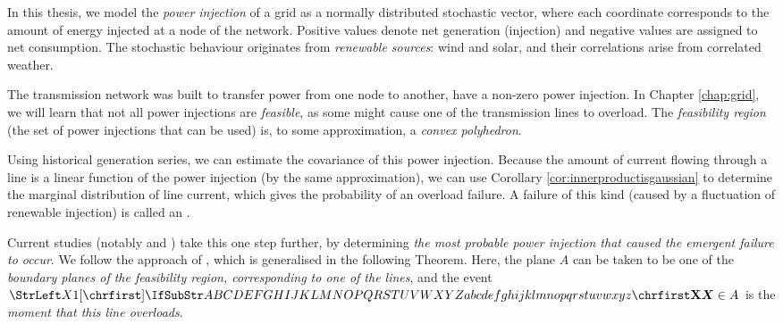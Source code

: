 \documentclass[main.tex]{subfiles}
\begin{document}
In this thesis, we model the \emph{power injection} of a grid as a normally distributed stochastic vector, where each coordinate corresponds to the amount of energy injected at a node of the network. Positive values denote net generation (injection) and negative values are assigned to net consumption. The stochastic behaviour originates from \emph{renewable sources}: wind and solar, and their correlations arise from correlated weather. 

The transmission network was built to transfer power from one node to another, \ie have a non-zero power injection.
In Chapter \ref{chap:grid}, we will learn that not all power injections are \emph{feasible}, as some might cause one of the transmission lines to overload. The \emph{feasibility region} (the set of power injections that can be used) is, to some approximation, a \emph{convex polyhedron}.

Using historical generation series, we can estimate the covariance of this power injection. Because the amount of current flowing through a line is a linear function of the power injection (by the same approximation), we can use Corollary \ref{cor:innerproductisgaussian} to determine the marginal distribution of line current, which gives the probability of an overload failure. A failure of this kind (\ie caused by a fluctuation of renewable injection) is called an .

Current studies (notably \cite{Nesti2018} and \cite{Chertkov2011}) take this one step further, by determining \emph{the most probable power injection that caused the emergent failure to occur}. We follow the approach of \cite{Nesti2018}, which is generalised in the following Theorem. Here, the plane $A$ can be taken to be one of the \emph{boundary planes of the feasibility region, corresponding to one of the lines}, and the event $\mat{X} \in A$ is the \emph{moment that this line overloads}.
\end{document}

